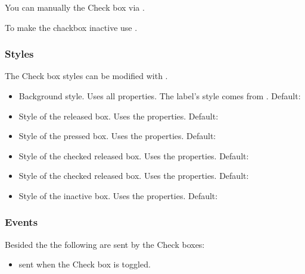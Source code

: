 \documentclass[letterpaper,10pt,english]{sphinxmanual}
\begin{document}
You can manually  the Check box  via .

To make the chackbox inactive use .


\subsubsection{Styles}
\label{\detokenize{object-types/cb:styles}}
The Check box styles can be modified with .
\begin{itemize}
\item {} 
 Background style. Uses all  properties. The label’s style comes from  . Default: 

\item {} 
 Style of the released box. Uses the  properties. Default: 

\item {} 
 Style of the pressed box. Uses the  properties. Default: 

\item {} 
 Style of the checked released box. Uses the  properties. Default: 

\item {} 
 Style of the checked released box. Uses the  properties. Default: 

\item {} 
 Style of the inactive box. Uses the  properties. Default: 

\end{itemize}


\subsubsection{Events}
\label{\detokenize{object-types/cb:events}}
Besided the  the following  are sent by the Check boxes:
\begin{itemize}
\item {} 
 sent when the Check box is toggled.

\end{itemize}
\end{document}

